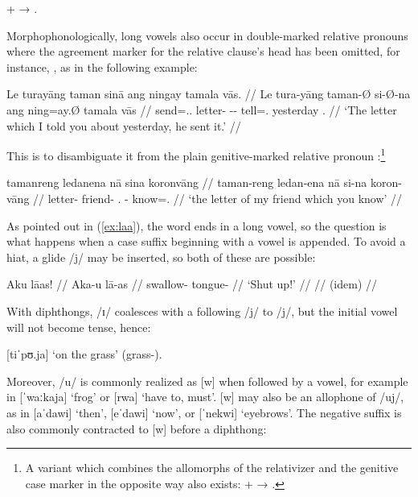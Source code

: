 \ex
	 +  → 
	.\label{ex:longvwls}
\xe

Morphophonologically, long vowels also occur in double-marked relative pronouns 
where the agreement marker for the relative clause's head has been omitted,
for instance, , as in the following 
example:\label{doublerel}

\ex\begingl
	\gla Le turayāng taman sinā ang ningay tamala vās. //
	\glb Le tura-yāng taman-Ø si-Ø-na ang ning=ay.Ø tamala vās //
	\glc \PatTI{} send=\Tsg{}.\M{}.\Aarg{} letter-\Top{} \Rel{}-\PatTI{}-\Gen{} \AgtT{} tell=\Fsg{}.\Top{} yesterday \Ssg{}.\Parg{} //
	\glft `The letter which I told you about yesterday, he sent it.' //
\endgl\xe

\noindent This is to disambiguate it from the plain genitive-marked relative pronoun 
:\footnote{A variant which combines the 
allomorphs of the relativizer and the genitive case marker in the opposite way 
also exists:  +  → .}

\ex\begingl
	\gla tamanreng ledanena nā sina koronvāng //
	\glb taman-reng ledan-ena nā si-na koron-vāng //
	\glc letter-\AargI{} friend-\Gen{} \Fsg.\Gen{} \Rel{}-\Gen{} know=\Ssg{}.\Aarg{} //
	\glft `the letter of my friend which you know' //
\endgl\xe

As pointed out in (\ref{ex:laa}), the word  ends in a 
long vowel, so the question is what happens when a case suffix beginning with a 
vowel is appended. To avoid a hiat, a glide /j/ may be inserted, so both of 
these are possible:

\pex
	\a\begingl
		\gla Aku lāas! //
		\glb Aka-u lā-as //
		\glc swallow-\Imp{} tongue-\Parg{} //
		\glft `Shut up!' //
	\endgl
	\a\begingl
		 //
		\glb (idem) //
	\endgl
\xe

\noindent With diphthongs, /ɪ/ coalesces with a following /j/ to /j/, but the 
initial vowel will not become tense, hence:

\ex
	 [tiˈpʊ.ja] `on the grass' (grass-\Loc{}).
\xe

Moreover, /u/ is commonly realized as [w] when followed by a vowel, for example 
in  [ˈwaːkaja] `frog' or  [rwa] `have 
to, must'. [w] may also be an allophone of /uj/, as in  
[aˈdawi] `then',  [eˈdawi] `now', or  
[ˈnekwi] `eyebrows'. The negative suffix  is also commonly 
contracted to [w] before a diphthong:

